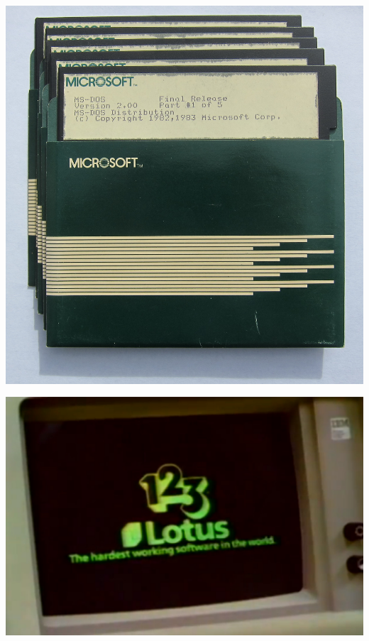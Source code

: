 \vfill
\pagebreak

\begin{center}
	\includegraphics[height=\textheight]{./IMG/MSDOS200-DISKS.jpg}
\end{center}

\vfill
\pagebreak

	\begin{center}
	\includegraphics[height=\textheight]{./IMG/screen_crop.jpeg}
\end{center}

